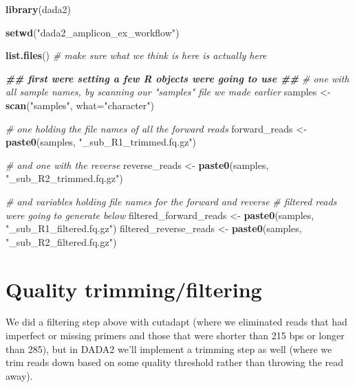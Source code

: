\documentclass[
]{book}
\newenvironment{Shaded}{\begin{snugshade}}{\end{snugshade}}
\newcommand{\AttributeTok}[1]{\textcolor[rgb]{0.13,0.29,0.53}{#1}}
\newcommand{\CommentTok}[1]{\textcolor[rgb]{0.56,0.35,0.01}{\textit{#1}}}
\newcommand{\DocumentationTok}[1]{\textcolor[rgb]{0.56,0.35,0.01}{\textbf{\textit{#1}}}}
\newcommand{\FunctionTok}[1]{\textcolor[rgb]{0.13,0.29,0.53}{\textbf{#1}}}
\newcommand{\NormalTok}[1]{#1}
\newcommand{\OtherTok}[1]{\textcolor[rgb]{0.56,0.35,0.01}{#1}}
\newcommand{\StringTok}[1]{\textcolor[rgb]{0.31,0.60,0.02}{#1}}
\begin{document}
\begin{Shaded}
\begin{Highlighting}[]
    \FunctionTok{library}\NormalTok{(dada2)}

    \FunctionTok{setwd}\NormalTok{(}\StringTok{"dada2\_amplicon\_ex\_workflow"}\NormalTok{)}

    \FunctionTok{list.files}\NormalTok{() }\CommentTok{\# make sure what we think is here is actually here}

    \DocumentationTok{\#\# first we\textquotesingle{}re setting a few R objects we\textquotesingle{}re going to use \#\#}
      \CommentTok{\# one with all sample names, by scanning our "samples" file we made earlier}
\NormalTok{  samples }\OtherTok{\textless{}{-}} \FunctionTok{scan}\NormalTok{(}\StringTok{"samples"}\NormalTok{, }\AttributeTok{what=}\StringTok{"character"}\NormalTok{)}

      \CommentTok{\# one holding the file names of all the forward reads}
\NormalTok{  forward\_reads }\OtherTok{\textless{}{-}} \FunctionTok{paste0}\NormalTok{(samples, }\StringTok{"\_sub\_R1\_trimmed.fq.gz"}\NormalTok{)}

      \CommentTok{\# and one with the reverse}
\NormalTok{  reverse\_reads }\OtherTok{\textless{}{-}} \FunctionTok{paste0}\NormalTok{(samples, }\StringTok{"\_sub\_R2\_trimmed.fq.gz"}\NormalTok{)}

      \CommentTok{\# and variables holding file names for the forward and reverse}
      \CommentTok{\# filtered reads we\textquotesingle{}re going to generate below}
\NormalTok{  filtered\_forward\_reads }\OtherTok{\textless{}{-}} \FunctionTok{paste0}\NormalTok{(samples, }\StringTok{"\_sub\_R1\_filtered.fq.gz"}\NormalTok{)}
\NormalTok{  filtered\_reverse\_reads }\OtherTok{\textless{}{-}} \FunctionTok{paste0}\NormalTok{(samples, }\StringTok{"\_sub\_R2\_filtered.fq.gz"}\NormalTok{)}
\end{Highlighting}
\end{Shaded}

\hypertarget{quality-trimmingfiltering}{%
\section{Quality trimming/filtering}\label{quality-trimmingfiltering}}

We did a filtering step above with cutadapt (where we eliminated reads that had imperfect or missing primers and those that were shorter than 215 bps or longer than 285), but in DADA2 we'll implement a trimming step as well (where we trim reads down based on some quality threshold rather than throwing the read away).
\end{document}

